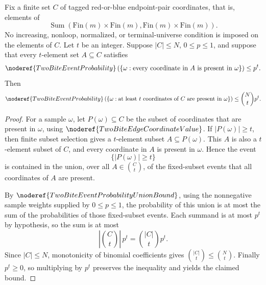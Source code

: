 \begin{lemma}
Fix a finite set \(C\) of tagged red-or-blue endpoint-pair coordinates, that
is, elements of
\[
\operatorname{Sum}(\mathrm{Fin}(m)\times\mathrm{Fin}(m),
  \mathrm{Fin}(m)\times\mathrm{Fin}(m)).
\]
No increasing, nonloop, normalized, or terminal-universe condition is imposed
on the elements of \(C\).  Let \(t\) be an integer.  Suppose \(|C|\le N\),
\(0\le p\le1\), and suppose that every \(t\)-element set \(A\subseteq C\)
satisfies
\[
\noderef{TwoBiteEventProbability}
\left(\{\omega:\text{every coordinate in }A\text{ is present in }\omega\}\right)
\le p^t .
\]
Then
\[
\noderef{TwoBiteEventProbability}
\left(\{\omega:\text{at least }t\text{ coordinates of }C
\text{ are present in }\omega\}\right)
\le \binom Nt p^t .
\]
\end{lemma}
\begin{proof}
For a sample \(\omega\), let \(P(\omega)\subseteq C\) be the subset of
coordinates that are present in \(\omega\), using
\(\noderef{TwoBiteEdgeCoordinateValue}\).  If \(|P(\omega)|\ge t\), then
finite subset selection gives a \(t\)-element subset \(A\subseteq P(\omega)\).
This \(A\) is also a \(t\)-element subset of \(C\), and every coordinate in
\(A\) is present in \(\omega\).  Hence the event
\[
\{|P(\omega)|\ge t\}
\]
is contained in the union, over all \(A\in\binom{C}{t}\), of the fixed-subset
events that all coordinates of \(A\) are present.

By \(\noderef{TwoBiteEventProbabilityUnionBound}\), using the nonnegative
sample weights supplied by \(0\le p\le1\), the probability of this union is at
most the sum of the probabilities of those fixed-subset events.  Each summand
is at most \(p^t\) by hypothesis, so the sum is at most
\[
|\binom{C}{t}|\,p^t=\binom{|C|}{t}p^t.
\]
Since \(|C|\le N\), monotonicity of binomial coefficients gives
\(\binom{|C|}{t}\le\binom Nt\).  Finally \(p^t\ge0\), so multiplying by
\(p^t\) preserves the inequality and yields the claimed bound.
\end{proof}
